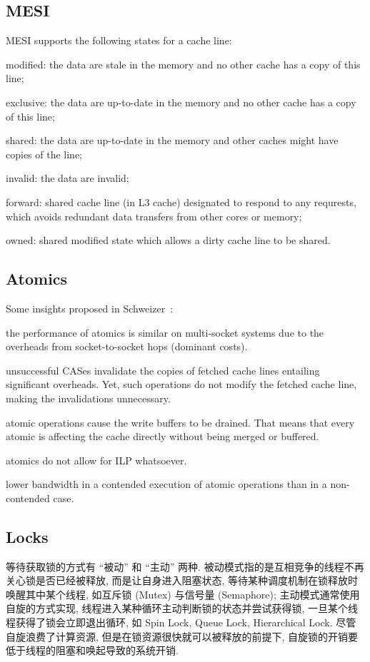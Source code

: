 \documentclass[UTF8,12pt,a4paper]{article}
\begin{document}
\subsection{MESI}
MESI supports the following states for a cache line:
\begin{compactitem}
  \item modified: the data are stale in the memory
  and no other cache has a copy of this line;
  \item exclusive: the data are up-to-date in the memory
  and no other cache has a copy of this line;
  \item shared: the data are up-to-date in the memory
  and other caches might have copies of the line;
  \item invalid: the data are invalid;
  \item forward: shared cache line (in L3 cache) designated to respond to any requrests,
  which avoids redundant data transfers from other cores or memory;
  \item owned: shared modified state which allows a dirty cache line to be shared.
\end{compactitem}
\subsection{Atomics}
Some insights proposed in Schweizer~\cite{DBLP:conf/IEEEpact/SchweizerBH15}:
\begin{compactitem}
  \item the performance of atomics is similar on multi-socket systems
  due to the overheads from socket-to-socket hops (dominant costs).
  \item unsuccessful CASes invalidate the copies of fetched cache lines
  entailing significant overheads.
  Yet, such operations do not modify the fetched cache line,
  making the invalidations unnecessary.
  \item atomic operations cause the write buffers to be drained.
  That means that every atomic is affecting the cache directly
  without being merged or buffered.
  \item atomics do not allow for ILP whatsoever.
  \item lower bandwidth in a contended execution of atomic operations
  than in a non-contended case.
\end{compactitem}
\subsection{Locks}
等待获取锁的方式有 ``被动'' 和 ``主动'' 两种.
被动模式指的是互相竞争的线程不再关心锁是否已经被释放,
而是让自身进入阻塞状态,
等待某种调度机制在锁释放时唤醒其中某个线程,
如互斥锁 (Mutex) 与信号量 (Semaphore);
主动模式通常使用自旋的方式实现,
线程进入某种循环主动判断锁的状态并尝试获得锁,
一旦某个线程获得了锁会立即退出循环,
如 Spin Lock, Queue Lock, Hierarchical Lock.
尽管自旋浪费了计算资源, 但是在锁资源很快就可以被释放的前提下,
自旋锁的开销要低于线程的阻塞和唤起导致的系统开销.
\end{document}

